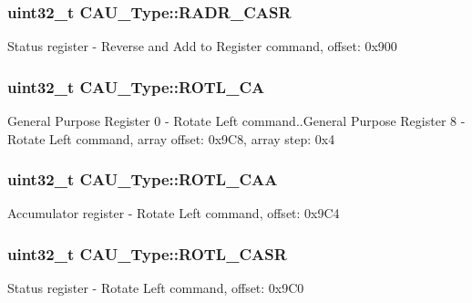 \subsubsection[{\texorpdfstring{R\+A\+D\+R\+\_\+\+C\+A\+SR}{RADR_CASR}}]{ uint32\+\_\+t C\+A\+U\+\_\+\+Type\+::\+R\+A\+D\+R\+\_\+\+C\+A\+SR}\hypertarget{structCAU__Type_af8ba9097649bc7890f0b1cf93fc9548a}{}\label{structCAU__Type_af8ba9097649bc7890f0b1cf93fc9548a}
Status register -\/ Reverse and Add to Register command, offset\+: 0x900 
\subsubsection[{\texorpdfstring{R\+O\+T\+L\+\_\+\+CA}{ROTL_CA}}]{ uint32\+\_\+t C\+A\+U\+\_\+\+Type\+::\+R\+O\+T\+L\+\_\+\+CA}\hypertarget{structCAU__Type_afea241b7804526e6b31c5608ee621110}{}\label{structCAU__Type_afea241b7804526e6b31c5608ee621110}
General Purpose Register 0 -\/ Rotate Left command..General Purpose Register 8 -\/ Rotate Left command, array offset\+: 0x9\+C8, array step\+: 0x4 
\subsubsection[{\texorpdfstring{R\+O\+T\+L\+\_\+\+C\+AA}{ROTL_CAA}}]{ uint32\+\_\+t C\+A\+U\+\_\+\+Type\+::\+R\+O\+T\+L\+\_\+\+C\+AA}\hypertarget{structCAU__Type_a068b622c2eb3fcfe7160c03cb8623ea4}{}\label{structCAU__Type_a068b622c2eb3fcfe7160c03cb8623ea4}
Accumulator register -\/ Rotate Left command, offset\+: 0x9\+C4 
\subsubsection[{\texorpdfstring{R\+O\+T\+L\+\_\+\+C\+A\+SR}{ROTL_CASR}}]{ uint32\+\_\+t C\+A\+U\+\_\+\+Type\+::\+R\+O\+T\+L\+\_\+\+C\+A\+SR}\hypertarget{structCAU__Type_a38c25ff544443843267d08dc292bb9a3}{}\label{structCAU__Type_a38c25ff544443843267d08dc292bb9a3}
Status register -\/ Rotate Left command, offset\+: 0x9\+C0 
